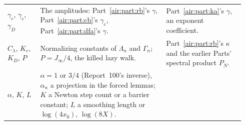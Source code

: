 \documentclass[11pt,letterpaper]{article}
\numberwithin{equation}{section}
\theoremstyle{remark}
\begin{document}
{\begin{longtable}{@{}>{\raggedright\arraybackslash}p{0.13\linewidth}>{\raggedright\arraybackslash}p{0.5\linewidth}>{\raggedright\arraybackslash}p{0.31\linewidth}@{}}
$\gamma_r$, $\gamma_c$, $\gamma_D$ & The amplitudes: Part~\ref{air:part:rb}'s $\gamma$, Part~\ref{air:part:cb}'s $\gamma_c$, Part~\ref{air:part:dfa}'s $\gamma$. & Part~\ref{air:part:ka}'s $\gamma$, an exponent coefficient.\\
$C_\lambda$, $K_c$, $K_D$, $P$ & Normalizing constants of $\Lambda_n$ and $\Gamma_n$; $P=J_\infty/4$, the killed lazy walk. & Part~\ref{air:part:rb}'s $\kappa$ and the earlier Parts' spectral product $P_N$.\\
$\alpha$, $K$, $L$ & $\alpha=1$ or $3/4$ (Report~100's inverse), $\alpha_n$ a projection in the forced lemmas; $K$ a Newton step count or a barrier constant; $L$ a smoothing length or $\log(4x_0)$, $\log(8X)$. & \\
\end{longtable}
}
\end{document}
